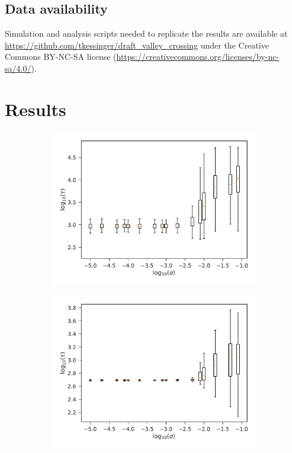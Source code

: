 \documentclass[10pt,twocolumn,twoside]{gsajnl}
\begin{document}
\begin{spacing}{1.5}
\subsection*{Data availability}

Simulation and analysis scripts needed to replicate the results are available at \url{https://github.com/tkessinger/draft_valley_crossing} under the Creative Commons BY-NC-SA license (\url{https://creativecommons.org/licenses/by-nc-sa/4.0/}).

\section{Results}

\begin{figure}[t]
\begin{subfigure}[b]{0.4\textwidth}
\includegraphics[width=\textwidth]{Figures/det_tunnel.pdf}
\end{subfigure}
\begin{subfigure}[b]{0.4\textwidth}
\includegraphics[width=\textwidth]{Figures/det_fix.pdf}

\end{subfigure}
\end{figure}
\end{spacing}
\end{document}
